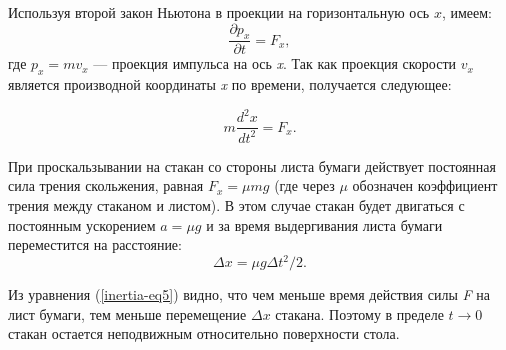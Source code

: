 \documentclass[14pt,a4paper,oneside]{extarticle}	%
\begin{document}
Используя второй закон Ньютона в проекции на горизонтальную ось $ x $, имеем:
\begin{equation}\label{inertia-eq1}
\frac{\partial p_{x}}{\partial t} = F_{x},
\end{equation}
где $ p_{x}=mv_{x} $ — проекция импульса на ось \textit{x}.
Так как проекция скорости $v_{x}$ является производной координаты \textit{x} по времени, получается следующее:
 
 \begin{equation}\label{inertia-eq2}
 m\frac{d^{2} x}{d t^{2}} = F_{x}.
 \end{equation}

При проскальзывании на стакан со стороны листа бумаги действует постоянная сила трения скольжения, равная $ F_{x} = \mu mg $ (где через $\mu$ обозначен коэффициент трения между стаканом и листом). В этом случае стакан будет двигаться с постоянным ускорением $a = \mu g$ и за время выдергивания листа бумаги переместится на расстояние:
\begin{equation}\label{inertia-eq5}
\Delta x = \mu g\Delta t^{2}/2.
\end{equation}

Из уравнения (\ref{inertia-eq5}) видно, что чем меньше время действия силы \textit{F} на лист бумаги, тем меньше перемещение $ \Delta x $ стакана.
Поэтому в пределе \mbox{$ t\longrightarrow0 $} стакан остается неподвижным относительно поверхности стола.  
\end{document}
